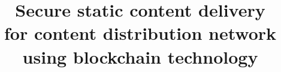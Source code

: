 \documentclass[conference,compsoc]{IEEEtran}
\begin{document}
%
\title{Secure static content delivery \\for content distribution network using blockchain technology}


\author{
}



% 








\maketitle
\end{document}
